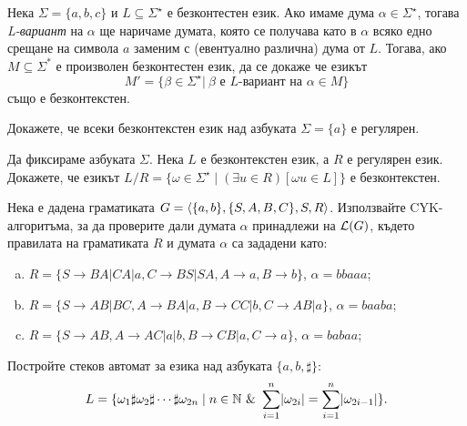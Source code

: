 \begin{problem}
  Нека $\Sigma = \{a,b,c\}$ и $L \subseteq \Sigma^\star$ е безконтестен език. Ако имаме дума 
  $\alpha \in \Sigma^\star$, тогава \emph{L-вариант} на $\alpha$ ще наричаме думата, която се получава като в $\alpha$ всяко едно 
  срещане на символа $a$ заменим с (евентуално различна) дума от $L$.
  Тогава, ако $M \subseteq \Sigma^*$ е произволен безконтестен език, да се докаже че езикът
  \begin{equation*}
    M' = \{\beta\in\Sigma^\star |\ \beta \text{ е $L$-вариант на } \alpha \in M \}
  \end{equation*}
  също е безконтекстен.
\end{problem}

\begin{problem}
  Докажете, че всеки безконтекстен език над азбуката $\Sigma = \{a\}$
  е регулярен.
\end{problem}

\begin{problem}
  Да фиксираме азбуката $\Sigma$.
  Нека $L$ е безконтекстен език, а $R$ е регулярен език.
  Докажете, че езикът
  $L/R = \{\omega \in \Sigma^\star \mid (\exists u \in R)[\omega u \in L]\}$
  е безконтекстен.
\end{problem}


\begin{problem}
  Нека е дадена граматиката $G = \langle{\{a,b\}, \{S,A,B,C\},S,R}\rangle$.
  Използвайте CYK-алгоритъма, за да проверите дали
  думата $\alpha$ принадлежи на $\mathcal{L}(G)$, където правилата на граматиката $R$ и думата $\alpha$
  са зададени като:
  \begin{enumerate}[a)]
  \item
    $R = \{S\rightarrow BA| CA|a, C\rightarrow BS|SA,A\rightarrow a, B\rightarrow b\}$, $\alpha=bbaaa$;
  \item
    $R =\{S\rightarrow AB|BC, A\rightarrow BA|a,B\rightarrow CC|b, C\rightarrow AB|a\}$, $\alpha=baaba$;
  \item
    $R = \{S\rightarrow AB, A\rightarrow AC|a|b,B\rightarrow CB|a, C\rightarrow a\}$, $\alpha=babaa$;
  \end{enumerate}
\end{problem}

\begin{problem}
  Постройте стеков автомат за езика над азбуката $\{a,b,\sharp\}$:
  \[L = \{\omega_1 \sharp \omega_2 \sharp \cdots \sharp \omega_{2n} \mid n\in\Nat\ \&\ \sum^n_{i=1}\abs{\omega_{2i}} = \sum^{n}_{i=1}\abs{\omega_{2i-1}}\}.\]
\end{problem}

